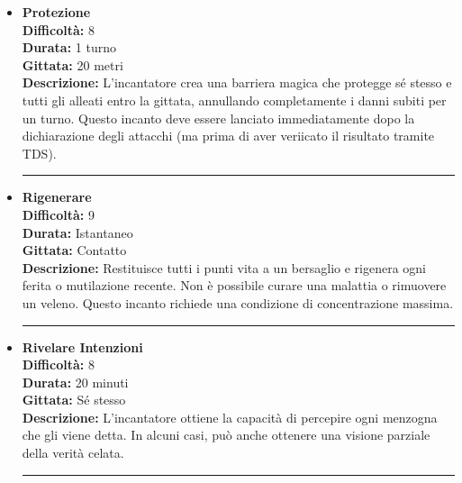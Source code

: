 \documentclass[./magie.tex]{subfiles}
\begin{document}
\begin{itemize}

\item \textbf{Protezione} \\
\textbf{Difficoltà:} 8 \\
\textbf{Durata:} 1 turno \\
\textbf{Gittata:} 20 metri \\
\textbf{Descrizione:} L'incantatore crea una barriera magica che protegge sé stesso e tutti gli alleati entro la gittata, annullando completamente i danni subiti per un turno. Questo incanto deve essere lanciato immediatamente dopo la dichiarazione degli attacchi (ma prima di aver veriicato il risultato tramite TDS).

\vspace{0.2cm}
\noindent
\begin{center}
\rule{\textwidth}{0.4pt} 
\end{center}
\vspace{0.2cm}

\item \textbf{Rigenerare} \\
\textbf{Difficoltà:} 9 \\
\textbf{Durata:} Istantaneo \\
\textbf{Gittata:} Contatto \\
\textbf{Descrizione:} Restituisce tutti i punti vita a un bersaglio e rigenera ogni ferita o mutilazione recente. Non è possibile curare una malattia o rimuovere un veleno. Questo incanto richiede una condizione di concentrazione massima.

\vspace{0.2cm}
\noindent
\begin{center}
\rule{\textwidth}{0.4pt} 
\end{center}
\vspace{0.2cm}

\item \textbf{Rivelare Intenzioni} \\
\textbf{Difficoltà:} 8 \\
\textbf{Durata:} 20 minuti \\
\textbf{Gittata:} Sé stesso \\
\textbf{Descrizione:} L'incantatore ottiene la capacità di percepire ogni menzogna che gli viene detta. In alcuni casi, può anche ottenere una visione parziale della verità celata.

\vspace{0.2cm}
\noindent
\begin{center}
\rule{\textwidth}{0.4pt} 
\end{center}
\vspace{0.2cm}


\end{itemize}
\end{document}
